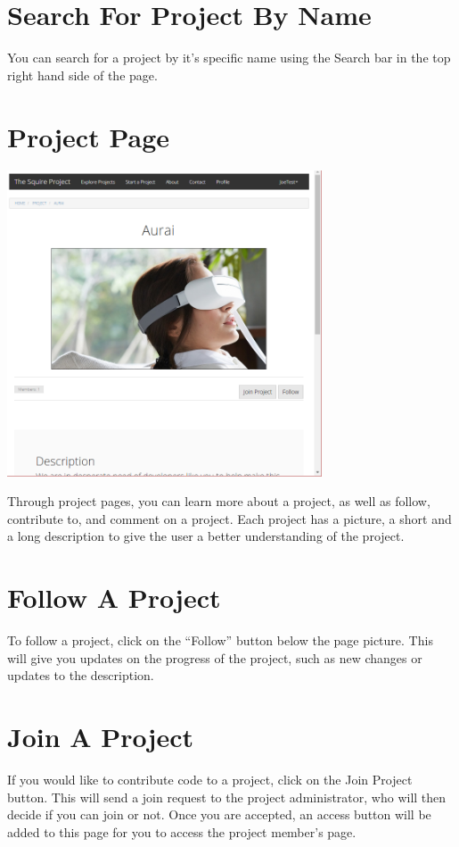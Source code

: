 \documentclass[11pt]{report}
\begin{document}
\section{Search For Project By Name}  
You can search for a project by it's specific name using the Search bar in the top right hand side of the page. 

\section{Project Page}
	\begin{center}
           \includegraphics[width=0.7\textwidth]{projectpage_top.png}
    \end{center}
Through project pages, you can learn more about a project, as well as follow, contribute to, and comment on a project. Each project has a picture, a short and a long description to give the user a better understanding of the project.

\section{Follow A Project}
To follow a project, click on the  “Follow” button below the page picture. This will give you updates on the progress of the project, such as new changes or updates to the description. 

\section{Join A Project}
If you would like to contribute code to a project, click on the Join Project button. This will send a join request to the project administrator, who will then decide if you can join or not. Once you are accepted, an access button will be added to this page for you to access the project member's page.
\end{document}
